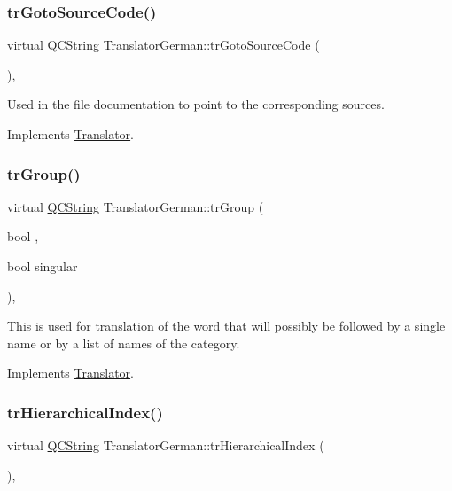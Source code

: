 \subsubsection{\texorpdfstring{trGotoSourceCode()}{trGotoSourceCode()}}
{\footnotesize\ttfamily virtual \mbox{\hyperlink{class_q_c_string}{Q\+C\+String}} Translator\+German\+::tr\+Goto\+Source\+Code (\begin{DoxyParamCaption}{ }\end{DoxyParamCaption})\hspace{0.3cm}{\ttfamily [inline]}, {\ttfamily [virtual]}}

Used in the file documentation to point to the corresponding sources. 

Implements \mbox{\hyperlink{class_translator}{Translator}}.

\mbox{\label{class_translator_german_acfb9fb7a0daff6079b7ecb712f74054b}} 
\subsubsection{\texorpdfstring{trGroup()}{trGroup()}}
{\footnotesize\ttfamily virtual \mbox{\hyperlink{class_q_c_string}{Q\+C\+String}} Translator\+German\+::tr\+Group (\begin{DoxyParamCaption}\item[{bool}]{,  }\item[{bool}]{singular }\end{DoxyParamCaption})\hspace{0.3cm}{\ttfamily [inline]}, {\ttfamily [virtual]}}

This is used for translation of the word that will possibly be followed by a single name or by a list of names of the category. 

Implements \mbox{\hyperlink{class_translator}{Translator}}.

\mbox{\label{class_translator_german_abadb7e652e6eb275723e8ffa43f08b3e}} 
\subsubsection{\texorpdfstring{trHierarchicalIndex()}{trHierarchicalIndex()}}
{\footnotesize\ttfamily virtual \mbox{\hyperlink{class_q_c_string}{Q\+C\+String}} Translator\+German\+::tr\+Hierarchical\+Index (\begin{DoxyParamCaption}{ }\end{DoxyParamCaption})\hspace{0.3cm}{\ttfamily [inline]}, {\ttfamily [virtual]}}

